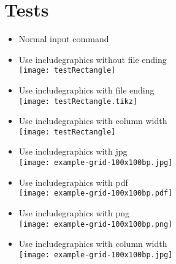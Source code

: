 \documentclass[twocolumn]{article}
\begin{document}
	\section*{Tests}
	\begin{itemize}
		\item Normal input command\\%
		\item Use includegraphics without file ending\\%
			\texttt{[image: testRectangle]}%
		\item Use includegraphics with file ending\\%
			\texttt{[image: testRectangle.tikz]}%
		\item Use includegraphics with column width\\%
			\texttt{[image: testRectangle]}%
		\item Use includegraphics with jpg\\%
			\texttt{[image: example-grid-100x100bp.jpg]}%
		\item Use includegraphics with pdf\\%
			\texttt{[image: example-grid-100x100bp.pdf]}%
		\item Use includegraphics with png\\%
			\texttt{[image: example-grid-100x100bp.png]}%
		\item Use includegraphics with column width\\%
			\texttt{[image: example-grid-100x100bp.jpg]}%
	\end{itemize}
\end{document}
